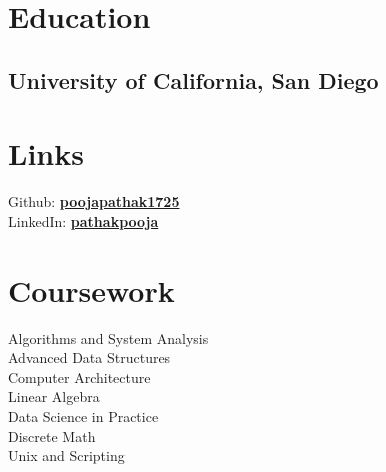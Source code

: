 \documentclass[]{deedy-resume-openfont}
\begin{document}
%
%
\lastupdated

%
%

%
%

\begin{minipage}[t]{0.33\textwidth} 


\section{Education} 

\subsection{University of California, \newline San Diego}
\sectionsep


\section{Links} 
Github: \href{https://github.com/poojapathak1725}{\bf poojapathak1725} \\
LinkedIn:  \href{https://www.linkedin.com/in/pathakpooja/}{\bf pathakpooja} \\


\section{Coursework}
Algorithms and System Analysis \\
Advanced Data Structures \\
Computer Architecture \\
Linear Algebra \\
Data Science in Practice \\
Discrete Math \\
Unix and Scripting  \\


\end{minipage}
\end{document}
